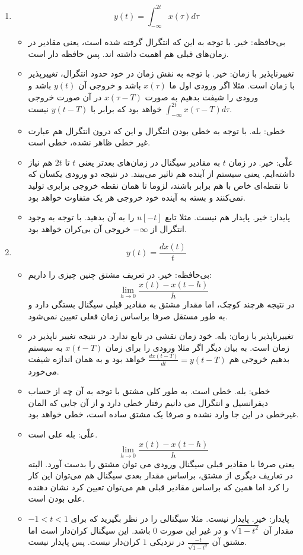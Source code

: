 \documentclass[12pt]{article}
\begin{document}
\begin{enumerate}[label = \harfi*)]

\item

$$
y(t) =\int_{-\infty}^{2 t} x(\tau) d \tau
$$

\begin{itemize}
	\item
 بی‌حافظه: خیر. با توجه به این که انتگرال گرفته شده است، یعنی مقادیر در زمان‌های قبلی هم اهمیت داشته اند. پس حافظه دار است.
	\item
تغییرناپذیر با زمان: خیر. با توجه به نقش زمان در خود حدود انتگرال، تغییرپذیر با زمان است. مثلا اگر ورودی اول ما $x(\tau)$ باشد و خروجی آن $y(t)$ باشد و ورودی را شیفت بدهیم به صورت
$x(\tau - T)$
در آن صورت خروجی
$\int_{-\infty}^{2t} x(\tau - T) d\tau$
خواهد بود که برابر با $y(t-T)$ نیست.
	\item
خطی: بله. با توجه به خطی بودن انتگرال و این که درون انتگرال هم عبارت غیر خطی ظاهر نشده، خطی است.
	\item
علّی: خیر. در زمان $t$ به مقادیر سیگنال در زمان‌های بعدتر یعنی $t$ تا $2t$ هم نیاز داشته‌ایم. یعنی سیستم از آینده هم تاثیر می‌بیند. در نتیجه دو ورودی یکسان که تا نقطه‌ای خاص با هم برابر باشند، لزوما تا همان نقطه خروجی برابری تولید نمی‌کنند و بسته به آینده خود خروجی هر یک متفاوت خواهد بود.
	\item
پایدار: خیر. پایدار هم نیست. مثلا تابع $u[-t]$ را به آن بدهید. با توجه به وجود انتگرال از $-\infty$ خروجی آن بی‌کران خواهد بود.
\end{itemize}


\item

$$
y(t) = \frac{d x(t)}{t}
$$

\begin{itemize}
	\item
	بی‌حافظه: خیر. در تعریف مشتق چنین چیزی را داریم:
	$$\lim_{h \to 0} \frac{x(t) - x(t-h)}{h}$$
	در نتیجه هر‌چند کوچک، اما مقدار مشتق به مقادیر قبلی سیگنال بستگی دارد و به طور مستقل صرفا براساس زمان فعلی تعیین نمی‌شود.
	\item
	تغییرناپذیر با زمان: بله. خود زمان نقشی در تابع ندارد. در نتیجه تغییر ناپذیر در زمان است. به بیان دیگر اگر مثلا ورودی را برای زمان $x(t-T)$ به سیستم بدهیم خروجی هم
	$\frac{d x(t-T)}{dt} = y(t-T)$
	خواهد بود و به همان اندازه شیفت می‌خورد.
	
	\item
	خطی: بله. خطی است. به طور کلی مشتق با توجه به آن چه از حساب دیفرانسیل و انتگرال می دانیم رفتار خطی دارد و از آن جایی که المان غیرخطی در این جا وارد نشده و صرفا یک مشتق ساده است، خطی خواهد بود.
	\item
	علّی: 
	بله علی است. 
		$$\lim_{h \to 0} \frac{x(t) - x(t-h)}{h}$$
		یعنی صرفا با مقادیر قبلی سیگنال ورودی می توان مشتق را بدست آورد. البته در تعاریف دیگری از مشتق، براساس مقدار بعدی سیگنال هم می‌توان این کار را کرد اما همین که براساس مقادیر قبلی هم می‌توان تعیین کرد نشان دهنده علی بودن است.
	\item
	پایدار: خیر. پایدار نیست. مثلا سیگنالی را در نظر بگیرید که برای $-1<t<1$ مقدار آن
	$\sqrt{1-t^2}$
	و در غیر این صورت $0$ باشد. این سیگنال کران‌دار است اما مشتق آن
	$\frac{-t}{\sqrt{1-t^2}}$
	در نزدیکی $1$ کران‌دار نیست. پس پایدار نیست.
	

\end{itemize}
\end{enumerate}
\end{document}

